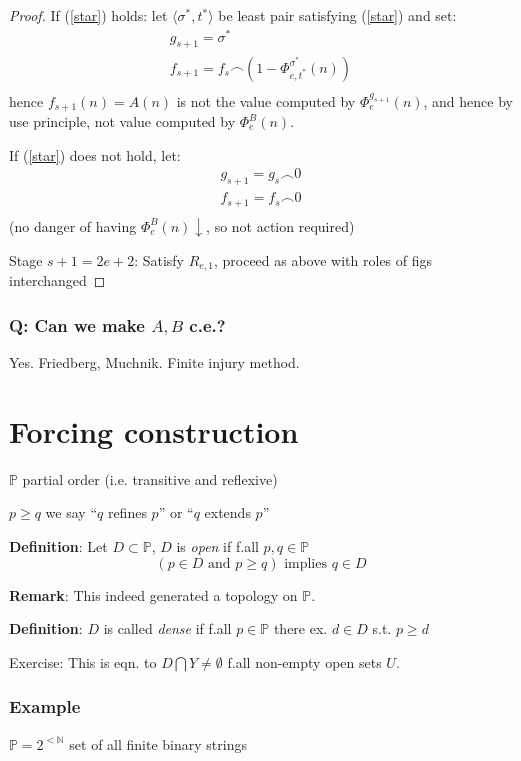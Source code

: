 \documentclass[12pt]{article}
\newcommand{\Nat}{\ensuremath{\mathbb{N}}}
\newcommand{\defn}{\textbf{Definition}: }
\begin{document}
\begin{proof}
 If (\ref{star}) holds: 
 let $\langle \sigma^*, t^* \rangle$ be least pair
 satisfying (\ref{star}) and set:
\begin{align*}
  g_{s+1} = \sigma^* \\
  f_{s+1} = f_s \frown \left(1 - \Phi^{\sigma^*}_{e,t^*}(n) \right) \\
\end{align*}
  hence $f_{s+1}(n) = A(n)$ is not the value computed by $\Phi^{g_{s+1}}_e(n)$,
  and hence by use principle, not value computed by $\Phi^B_e(n)$.

  If (\ref{star}) does not hold, let:
  \begin{align*}
    g_{s+1} = g_s \frown 0 \\
    f_{s+1} = f_s \frown 0 \\
  \end{align*}
  (no danger of having $\Phi^B_e(n) \downarrow$, so not action required)

  Stage $s+1 = 2e + 2$:
  Satisfy $R_{e,1}$, proceed as above with roles of figs interchanged
\end{proof}

\subsubsection*{Q: Can we make $A,B$ c.e.?}
Yes. Friedberg, Muchnik.
Finite injury method.

\section*{Forcing construction}
$\mathbb{P}$ partial order (i.e. transitive and reflexive)

$p \ge q$ we say ``$q$ refines $p$'' or ``$q$ extends $p$''

\defn Let $D \subset \mathbb{P}$,
$D$ is \emph{open} if f.all $p,q \in \mathbb{P}$
\[
(p \in D \text{ and } p \ge q) \text{ implies } q \in D
\]

\textbf{Remark}: This indeed generated a topology on $\mathbb{P}$.

\defn $D$ is called \emph{dense} if f.all $p \in \mathbb{P}$ there ex. $d \in D$ s.t. $p \ge d$

Exercise: This is eqn. to $D \bigcap Y \ne \emptyset$ f.all non-empty open sets $U$.


\subsubsection*{Example}
$\mathbb{P} = 2^{< \Nat}$ set of all finite binary strings
\end{document}
